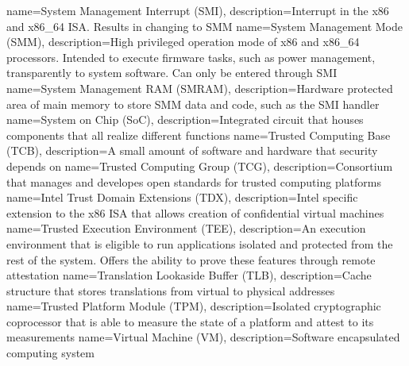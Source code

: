 {
  name=System Management Interrupt (SMI),
  description={Interrupt in the x86 and x86\_64 ISA. Results in changing to SMM}
}
{
  name=System Management Mode (SMM),
  description={High privileged operation mode of x86 and x86\_64 processors. Intended to execute firmware tasks, such
  as power management, transparently to system software. Can only be entered through SMI}
}
{
  name=System Management RAM (SMRAM),
  description={Hardware protected area of main memory to store SMM data and code, such as the
  SMI handler}
}
{
  name=System on Chip (SoC),
  description={Integrated circuit that houses components that all realize different functions}
}
%
{
  name=Trusted Computing Base (TCB),
  description={A small amount of software and hardware that security depends on}
}
{
  name=Trusted Computing Group (TCG),
  description={Consortium that manages and developes open standards for trusted computing platforms}
}
{
  name=Intel Trust Domain Extensions (TDX),
  description={Intel specific extension to the x86 ISA that allows creation of confidential virtual machines}
}
{
  name=Trusted Execution Environment (TEE),
  description={An execution environment that is eligible to run applications isolated and protected from the rest of
  the system. Offers the ability to prove these features through remote attestation}
}
{
  name=Translation Lookaside Buffer (TLB),
  description={Cache structure that stores translations from virtual to physical addresses}
}
{
  name=Trusted Platform Module (TPM),
  description={Isolated cryptographic coprocessor that is able to measure the state of a platform and attest to its measurements}
}
%
{
  name=Virtual Machine (VM),
  description={Software encapsulated computing system}
}
